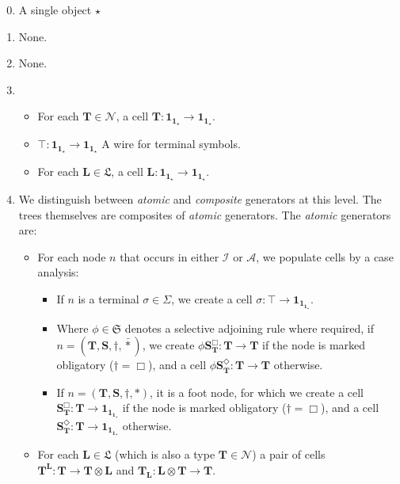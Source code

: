 \begin{myboxB}
\begin{multicols}{2}
\begin{construction}
\begin{enumerate}
\setcounter{enumi}{-1}
\item{A single object $\star$}
\item{None.}
\item{None.}
\item{
	\begin{itemize}
	\item{For each $\mathbf{T} \in \mathcal{N}$, a cell $\mathbf{T}: \mathbf{1}_{\mathbf{1}_\star} \rightarrow \mathbf{1}_{\mathbf{1}_\star}$.}
	\item{$\top: \mathbf{1}_{\mathbf{1}_\star} \rightarrow \mathbf{1}_{\mathbf{1}_\star}$ A wire for terminal symbols.}
	\item{For each $\mathbf{L} \in \mathfrak{L}$, a cell $\mathbf{L} : \mathbf{1}_{\mathbf{1}_\star} \rightarrow \mathbf{1}_{\mathbf{1}_\star}$.}
	\end{itemize}
}
\item{
	We distinguish between \emph{atomic} and \emph{composite} generators at this level. The trees themselves are composites of \emph{atomic} generators. The \emph{atomic} generators are:
	\begin{itemize}
	\item{For each node $n$ that occurs in either $\mathcal{I}$ or $\mathcal{A}$, we populate cells by a case analysis:
	\begin{itemize}
		\item{If $n$ is a terminal $\sigma \in \Sigma$, we create a cell $\sigma: \top \rightarrow \mathbf{1}_{\mathbf{1}_{\mathbf{1}_\star}}$.}
		\item{Where $\phi \in \mathfrak{S}$ denotes a selective adjoining rule where required, if $n = (\mathbf{T},\mathbf{S},\dagger,\bar{*})$, we create $\phi\mathbf{S}_\mathbf{T}^\Box: \mathbf{T} \rightarrow \mathbf{T}$ if the node is marked obligatory ($\dagger = \Box$), and a cell $\phi\mathbf{S}_\mathbf{T}^\Diamond: \mathbf{T} \rightarrow \mathbf{T}$ otherwise.}
		\item{If $n = (\mathbf{T},\mathbf{S},\dagger,*)$, it is a foot node, for which we create a cell $\mathbf{S}_\mathbf{T}^\Box: \mathbf{T} \rightarrow \mathbf{1}_{\mathbf{1}_{\mathbf{1}_\star}}$ if the node is marked obligatory ($\dagger = \Box$), and a cell $\mathbf{S}_\mathbf{T}^\Diamond: \mathbf{T} \rightarrow \mathbf{1}_{\mathbf{1}_{\mathbf{1}_\star}}$ otherwise.}
	\end{itemize}
	}
	\item{For each $\mathbf{L} \in \mathfrak{L}$ (which is also a type $\mathbf{T} \in \mathcal{N}$) a pair of cells $\mathbf{T}^\mathbf{L} : \mathbf{T} \rightarrow \mathbf{T} \otimes \mathbf{L}$ and $\mathbf{T}_\mathbf{L} : \mathbf{L} \otimes \mathbf{T} \rightarrow \mathbf{T}$.}

\end{itemize}}
\end{enumerate}
\end{construction}
\end{multicols}
\end{myboxB}
